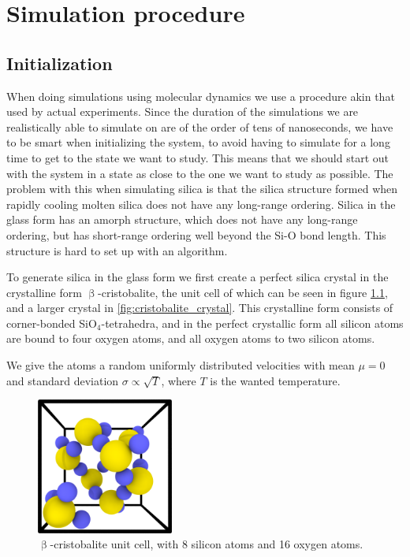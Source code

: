 \chapter{Simulation procedure}
\section{Initialization\label{sec:experimental_procedure}}
When doing simulations using molecular dynamics we use a procedure akin that used by actual experiments. Since the duration of the simulations we are realistically able to simulate on are of the order of tens of nanoseconds, we have to be smart when initializing the system, to avoid having to simulate for a long time to get to the state we want to study. This means that we should start out with the system in a state as close to the one we want to study as possible. The problem with this when simulating silica is that the silica structure formed when rapidly cooling molten silica does not have any long-range ordering. Silica in the glass form has an amorph structure, which does not have any long-range ordering, but has short-range ordering well beyond the Si-O bond length. This structure is hard to set up with an algorithm.

To generate silica in the glass form we first create a perfect silica crystal in the crystalline form $\upbeta$-cristobalite, the unit cell of which can be seen in figure \cref{fig:beta_cristobalite-unit_cell}, and a larger crystal in \cref{fig:cristobalite_crystal}. This crystalline form consists of corner-bonded SiO$_4$-tetrahedra, and in the perfect crystallic form all silicon atoms are bound to four oxygen atoms, and all oxygen atoms to two silicon atoms. 

We give the atoms a random uniformly distributed velocities with mean $\mu = 0$ and standard deviation $\sigma \propto \sqrt{T}$, where $T$ is the wanted temperature.%
\begin{figure}[htb]%
    \centering%
    \includegraphics[width=0.4\textwidth]{images/beta_cristobalite/unit_cell05_cropped.png}%
    \caption{%
        $\upbeta$-cristobalite unit cell, with 8 silicon atoms and 16 oxygen atoms.%
        \label{fig:beta_cristobalite-unit_cell}%
    }%
\end{figure}%

